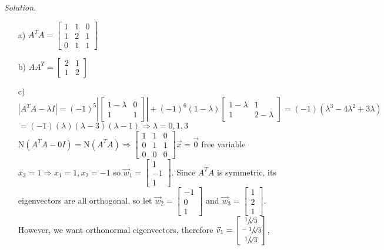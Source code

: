 \documentclass[12pt,pdftex]{article}
\begin{document}
\begin{itemize}
\textit{Solution.}
\begin{itemize}
\item[a)] $A^TA=\begin{bmatrix}
			1 & 1 & 0 \\ 1 & 2 & 1 \\ 0 & 1 & 1
			\end{bmatrix}$
\item[b)] $AA^T=\begin{bmatrix}
			2 & 1 \\ 1 & 2
			\end{bmatrix}$
\item[c)] $|A^TA-\lambda I|=(-1)^5\left|\begin{bmatrix}
			1-\lambda & 0 \\ 1 & 1
			\end{bmatrix}\right|+(-1)^6(1-\lambda)\begin{bmatrix}
			1 - \lambda & 1 \\ 1 & 2 - \lambda
			\end{bmatrix}=(-1)(\lambda^3-4\lambda^2+3\lambda)$\\
            $=(-1)(\lambda)(\lambda-3)(\lambda-1)\Rightarrow\lambda=0,1,3$\\
            N$(A^TA-0I)=$N$(A^TA)\Rightarrow\begin{bmatrix}1 & 1 & 0 \\ 0 & 1 & 1 \\ 0 & 0 & 0\end{bmatrix}\vec{x}=\vec{0}$
            free variable $x_3=1\Rightarrow x_1=1,x_2=-1$ so 
            $\vec{w}_1=\begin{bmatrix} 1 \\ -1 \\ 1\end{bmatrix}$.
            Since $A^TA$ is symmetric, its eigenvectors are all orthogonal, so let 
            $\vec{w}_2=\begin{bmatrix}-1 \\ 0 \\ 1\end{bmatrix}$ and 
            $\vec{w}_3=\begin{bmatrix}1 \\ 2 \\ 1\end{bmatrix}$. However, we want orthonormal eigenvectors, therefore
            $\vec{v}_1=
            	\begin{bmatrix}\sfrac{1}{\sqrt[]{3}} \\ \sfrac{-1}{\sqrt[]{3}} \\ \sfrac{1}{\sqrt[]{3}}\end{bmatrix}$,

\end{itemize}
\end{itemize}
\end{document}
